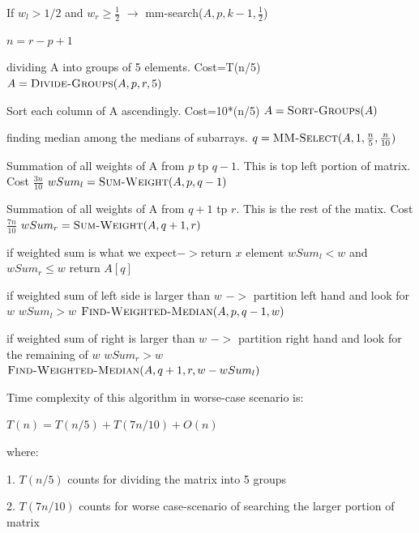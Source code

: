 \documentclass[11pt]{article}
\begin{document}
\begin{enumerate}
	\hspace{10mm} If $w_{l}>1/2$ and $w_{r} \geq \frac{1}{2}$ $\longrightarrow$ mm-search($A,p,k-1,\frac{1}{2}$)
	
	
	\begin{codebox}
		\li $n=r-p+1$

		\li \Comment dividing A into groups of 5 elements. Cost=T(n/5)
		\li $A= \textnormal{\scshape Divide-Groups}(A,p,r,5)$
		
		\li \Comment Sort each column of A ascendingly. Cost=10*(n/5)
		\li $A= \textnormal{\scshape Sort-Groups}(A)$

		\li \Comment finding median among the medians of subarrays. 
		\li $q= \textnormal{\scshape MM-Select}(A,1,\frac{n}{5} ,\frac{n}{10})$
		
		\li \Comment Summation of all weights of A from $p$ tp $q-1$. This is top left portion of matrix. Cost $\frac{3n}{10}$ 
		\li $wSum_{l} = \textnormal{\scshape Sum-Weight}(A,p,q-1)$ 

		\li \Comment Summation of all weights of A from $q+1$ tp $r$. This is the rest of the matix. Cost $\frac{7n}{10}$
		\li $wSum_{r} = \textnormal{\scshape Sum-Weight}(A,q+1,r)$ 

		\li \Comment if weighted sum is what we expect$->$return $x$ element
		\li \If $wSum_{l}<w$ and $wSum_{r}\leq w$
		\li \Do	
			return $A[q]$
		\End
		
		\li \Comment if weighted sum of left side is larger than $w$ $->$ partition left hand and look for $w$ 
		\li \ElseIf $wSum_{l}> w$ 
		\li \Do	
			$\textnormal{\scshape Find-Weighted-Median}(A,p,q-1,w)$
		\End

		\li \Comment if weighted sum of right is larger than $w$ $->$ partition right hand and look for the remaining of $w$ 
		\li \ElseIf $wSum_{r}> w$
		\li \Do	
			$\textnormal{\scshape Find-Weighted-Median}(A,q+1,r,w-wSum_{l})$
		\End
 
	\end{codebox}
	
	Time complexity of this algorithm in worse-case scenario is:
	
	\hspace{10mm} $T(n)=T(n/5)+T(7n/10)+O(n)$
	
	where:
	
	\hspace{10mm} 1. $T(n/5)$ counts for dividing the matrix into 5 groups
	
	\hspace{10mm} 2. $T(7n/10)$ counts for worse case-scenario of searching the larger portion of matrix
	

\end{enumerate}
\end{document}
